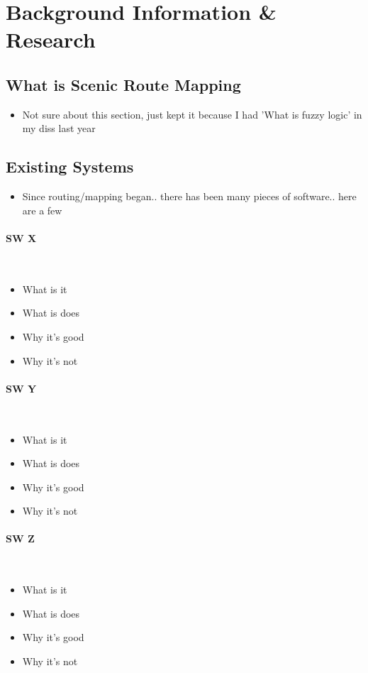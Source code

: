\section{Background Information \& Research}

\subsection{What is Scenic Route Mapping}
{\color{red}
	\begin{itemize}
		\item Not sure about this section, just kept it because I had 'What is fuzzy logic' in my diss last year
	\end{itemize}
}

\subsection{Existing Systems}
\label{sec:existing-systems}
{\color{red}
	\begin{itemize}
		\item Since routing/mapping began.. there has been many pieces of software.. here are a few
	\end{itemize}
}

\paragraph{SW X}\ \\
{\color{red}
	\begin{itemize}
		\item What is it
		\item What is does
		\item Why it's good
		\item Why it's not
	\end{itemize}
}

\paragraph{SW Y}\ \\
{\color{red}
	\begin{itemize}
		\item What is it
		\item What is does
		\item Why it's good
		\item Why it's not
	\end{itemize}
}

\paragraph{SW Z}\ \\
{\color{red}
	\begin{itemize}
		\item What is it
		\item What is does
		\item Why it's good
		\item Why it's not
	\end{itemize}
}


